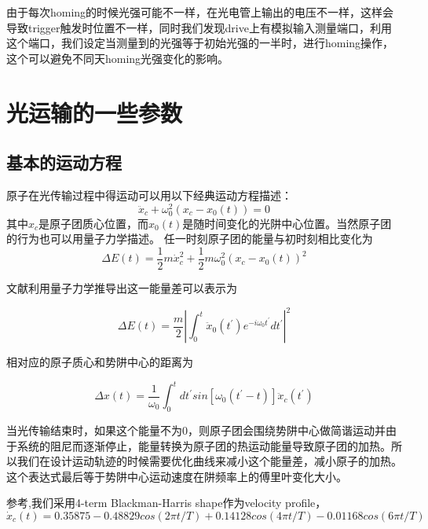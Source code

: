 \documentclass[onecolumn,a4paper,10pt]{article}
\begin{document}
由于每次homing的时候光强可能不一样，在光电管上输出的电压不一样，这样会导致trigger触发时位置不一样，同时我们发现drive上有模拟输入测量端口，利用这个端口，我们设定当测量到的光强等于初始光强的一半时，进行homing操作，这个可以避免不同天homing光强变化的影响。


\section{光运输的一些参数}
\subsection{基本的运动方程}

原子在光传输过程中得运动可以用以下经典运动方程描述：
\begin{equation}
\ddot{x}_{c}+\omega^{2}_{0}(x_{c}-x_{0}(t))=0
\end{equation}
其中$x_{c}$是原子团质心位置，而$x_{0}(t)$是随时间变化的光阱中心位置。当然原子团的行为也可以用量子力学描述。
任一时刻原子团的能量与初时刻相比变化为
\begin{equation}
	\Delta E(t)=\frac{1}{2} m \dot{x}^{2}_{c}+\frac{1}{2} m \omega^{2}_{0}(x_{c}-x_{0}(t))^{2}
\end{equation}

文献\cite{Trans3}利用量子力学推导出这一能量差可以表示为

\begin{equation}
	\Delta E(t)=\frac{m}{2} |\int_{0}^{t} \ddot{x}_{0}(t^{'})e^{-i\omega_{0}t^{'}}dt^{'}|^{2}
\end{equation}

相对应的原子质心和势阱中心的距离为

\begin{equation}
	\Delta x(t)=\frac{1}{\omega_{0}}\int_{0}^{t}dt^{'} sin[\omega_{0}(t^{'}-t)]\ddot{x}_{c}(t^{'})
\end{equation}

当光传输结束时，如果这个能量不为0，则原子团会围绕势阱中心做简谐运动并由于系统的阻尼而逐渐停止，能量转换为原子团的热运动能量导致原子团的加热。所以我们在设计运动轨迹的时候需要优化曲线来减小这个能量差，减小原子的加热。这个表达式最后等于势阱中心运动速度在阱频率上的傅里叶变化大小。

参考\cite{nonadia},我们采用4-term Blackman-Harris shape作为velocity profile，
\begin{equation}
		\dot{x}_{c}(t)= 0.35875 - 0.48829 cos(2\pi t/T)+0.14128 cos(4\pi t/T)-0.01168cos(6\pi t/T)
\end{equation}
\end{document}
